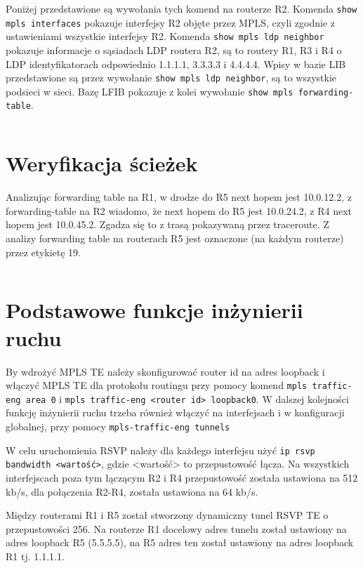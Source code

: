 \documentclass[a4paper,12pt,notitlepage]{article}
\begin{document}
Poniżej przedstawione są wywołania tych komend na routerze R2. Komenda \texttt{show mpls interfaces} pokazuje interfejsy R2 objęte przez MPLS, czyli zgodnie z ustawieniami wszystkie interfejsy R2. Komenda \texttt{show mpls ldp neighbor} pokazuje informacje o sąsiadach LDP routera R2, są to routery R1, R3 i R4 o LDP identyfikatorach odpowiednio 1.1.1.1, 3.3.3.3 i 4.4.4.4. Wpisy w bazie LIB przedstawione są przez wywołanie \texttt{show mpls ldp neighbor}, są to wszystkie podsieci w sieci. Bazę LFIB pokazuje z kolei wywołanie \texttt{show mpls forwarding-table}.
\inputminted[label=Weryfikacja MPLS/LDP na R2, firstline=204, lastline=307]{text}{R/R2.txt}

\section{Weryfikacja ścieżek}

Analizując forwarding table na R1, w drodze do R5 next hopem jest 10.0.12.2, z forwarding-table na R2 wiadomo, że next hopem do R5 jest 10.0.24.2, z R4 next hopem jest 10.0.45.2. Zgadza się to z trasą pokazywaną przez traceroute. Z analizy forwarding table na routerach R5 jest oznaczone (na każdym routerze) przez etykietę 19.
\inputminted[label=Forwarding table R1, firstline=253, lastline=272]{text}{R/R1.txt}

\section{Podstawowe funkcje inżynierii ruchu}

By wdrożyć MPLS TE należy skonfigurować router id na adres loopback i włączyć MPLS TE dla protokołu routingu przy pomocy komend \texttt{mpls traffic-eng area 0} i \texttt{mpls traffic-eng <router id> loopback0}. W dalszej kolejności funkcję inżynierii ruchu trzeba również włączyć na interfejsach i w konfiguracji globalnej, przy pomocy \texttt{mpls-traffic-eng tunnels}

W celu uruchomienia RSVP należy dla każdego interfejsu użyć \texttt{ip rsvp bandwidth <wartość>}, gdzie <wartość> to przepustowość łącza. Na wszystkich interfejscach poza tym łączącym R2 i R4 przepustowość została ustawiona na 512 kb/s, dla połączenia R2-R4, została ustawiona na 64 kb/s. 

Między routerami R1 i R5 został stworzony dynamiczny tunel RSVP TE o przepustowości 256. Na routerze R1 docelowy adres tunelu został ustawiony na adres loopback R5 (5.5.5.5), na R5 adres ten został ustawiony na adres loopback R1 tj. 1.1.1.1.
\end{document}
